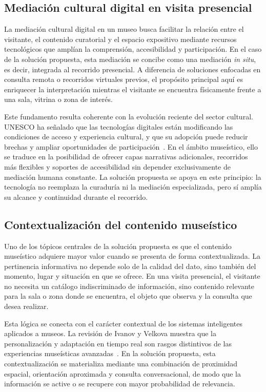 \subsection{Mediaci\'on cultural digital en visita presencial}

La mediaci\'on cultural digital en un museo busca facilitar la relaci\'on entre el visitante, el contenido curatorial y el espacio expositivo mediante recursos tecnol\'ogicos que ampl\'ian la comprensi\'on, accesibilidad y participaci\'on. En el caso de la solución propuesta, esta mediaci\'on se concibe como una mediaci\'on \textit{in situ}, es decir, integrada al recorrido presencial. A diferencia de soluciones enfocadas en consulta remota o recorridos virtuales previos, el prop\'osito principal aqu\'i es enriquecer la interpretaci\'on mientras el visitante se encuentra f\'isicamente frente a una sala, vitrina o zona de inter\'es.

Este fundamento resulta coherente con la evoluci\'on reciente del sector cultural. UNESCO ha se\~nalado que las tecnolog\'ias digitales est\'an modificando las condiciones de acceso y experiencia cultural, y que su adopci\'on puede reducir brechas y ampliar oportunidades de participaci\'on~\cite{unesco2025globalreport}. En el \'ambito muse\'istico, ello se traduce en la posibilidad de ofrecer capas narrativas adicionales, recorridos m\'as flexibles y soportes de accesibilidad sin depender exclusivamente de mediaci\'on humana constante. La solución propuesta se apoya en este principio: la tecnolog\'ia no reemplaza la curadur\'ia ni la mediaci\'on especializada, pero s\'i ampl\'ia su alcance y continuidad durante el recorrido.

\subsection{Contextualizaci\'on del contenido muse\'istico}

Uno de los t\'opicos centrales de la solución propuesta es que el contenido muse\'istico adquiere mayor valor cuando se presenta de forma contextualizada. La pertinencia informativa no depende solo de la calidad del dato, sino tambi\'en del momento, lugar y situaci\'on en que se ofrece. En una visita presencial, el visitante no necesita un cat\'alogo indiscriminado de informaci\'on, sino contenido relevante para la sala o zona donde se encuentra, el objeto que observa y la consulta que desea realizar.

Esta l\'ogica se conecta con el car\'acter contextual de los sistemas inteligentes aplicados a museos. La revisi\'on de Ivanov y Velkova muestra que la personalizaci\'on y adaptaci\'on en tiempo real son rasgos distintivos de las experiencias muse\'isticas avanzadas~\cite{ivanov2025smartmuseums}. En la solución propuesta, esta contextualizaci\'on se materializa mediante una combinaci\'on de proximidad espacial, orientaci\'on aproximada y consulta conversacional, de modo que la informaci\'on se active o se recupere con mayor probabilidad de relevancia.

